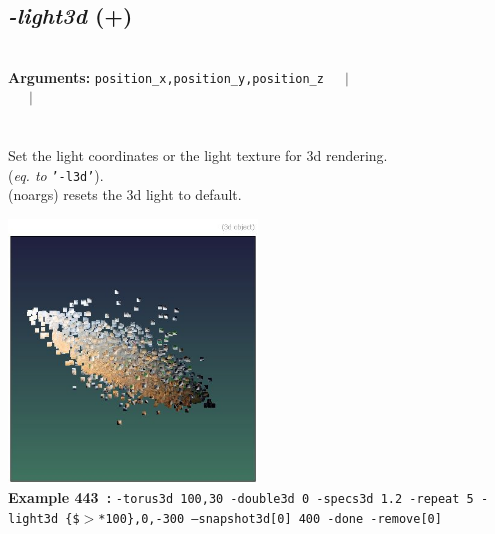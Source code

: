 \documentclass[a4paper,11pt,twoside]{book}
\begin{document}
\subsection{\emph{-light3d} (+)}\vspace*{-0.5em}
~\\\textbf{Arguments: } 
{\small \texttt{position\_x,position\_y,position\_z}}~~~$|$\\
\hspace*{2.2cm}{\small \texttt{[texture]}}~~~$|$\\
\\~\\
Set the light coordinates or the light texture for 3d rendering.
~\\(\emph{eq. to} {\small \texttt{'-l3d'}}).
~\\(noargs) resets the 3d light to default.
\begin{center}\includegraphics[keepaspectratio=true,height=7cm,width=\textwidth]{img/gmic_def443.jpg}\\
{\footnotesize \textbf{Example 443~:} \texttt{-torus3d 100,30 -double3d 0 -specs3d 1.2 -repeat 5 -light3d \{\$$>$*100\},0,-300 --snapshot3d[0] 400 -done -remove[0]}}
\end{center}
\end{document}
